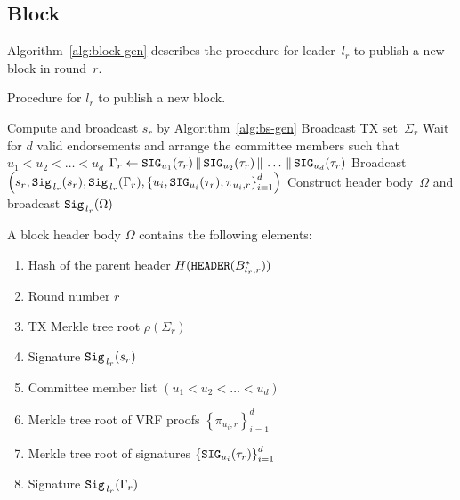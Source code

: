 \documentclass{article}
\begin{document}
\subsection{Block}

Algorithm~\ref{alg:block-gen} describes the procedure for leader~$l_r$ to publish a new block in round~$r$.

\begin{algorithm}[H]
\caption{Procedure for $l_r$ to publish a new block.}
\label{alg:block-gen}
\begin{spacing}{1.2}
\begin{algorithmic}[1]
    \vspace{1ex}
    \State Compute and broadcast $s_r$ by Algorithm~\ref{alg:bs-gen}
    \State Broadcast TX set~$\Sigma_r$
    \State Wait for $d$ valid endorsements and arrange the committee members such that $u_1<u_2<\dots<u_d$
    \State $\Gamma_r\leftarrow{\tt SIG}_{u_1}(\tau_r)\,\|\,{\tt SIG}_{u_2}(\tau_r)\,\|\,\dots\,\|\,{\tt SIG}_{u_d}(\tau_r)$
    \State Broadcast $\left(s_r,{\tt Sig}_{\,l_r}(s_r),{\tt Sig}_{\,l_r}(\Gamma_r),
    \left\{u_i,{\tt SIG}_{u_i}(\tau_r),\pi_{u_i,r}\right\}_{i=1}^d\right)$
    \State Construct header body~$\Omega$ and broadcast ${\tt Sig}_{\,l_r}(\Omega)$
\end{algorithmic}
\end{spacing}
\end{algorithm}

A block header body $\Omega$ contains the following elements:
\begin{enumerate}
    \item Hash of the parent header $H({\tt HEADER}(B_{l_r,r}^*))$ 
    \item Round number $r$
    \item TX Merkle tree root $\rho\left(\Sigma_r\right)$
    \item Signature ${\tt Sig}_{\,l_r}(s_r)$
    \item Committee member list $\left(u_1<u_2<\dots<u_d\right)$
    \item Merkle tree root of VRF proofs $\left\{\pi_{u_i,r}\right\}_{i=1}^d$
    \item Merkle tree root of signatures $\left\{{\tt SIG}_{u_i}(\tau_r)\right\}_{i=1}^d$
    \item Signature ${\tt Sig}_{\,l_r}(\Gamma_r)$
\end{enumerate}
\end{document}
